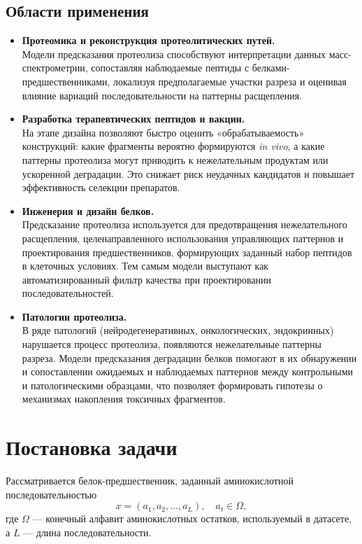 \documentclass{article}
\begin{document}
\subsection{Области применения}
\begin{itemize}
  \item \textbf{Протеомика и реконструкция протеолитических путей.}\\
  Модели предсказания протеолиза способствуют интерпретации данных масс-спектрометрии, сопоставляя наблюдаемые пептиды с белками-предшественниками, локализуя предполагаемые участки разреза и оценивая влияние вариаций последовательности на паттерны расщепления. 

  \item \textbf{Разработка терапевтических пептидов и вакцин.}\\
  На этапе дизайна позволяют быстро оценить «обрабатываемость» конструкций: какие фрагменты вероятно формируются \textit{in vivo}, а какие паттерны протеолиза могут приводить к нежелательным продуктам или ускоренной деградации. Это снижает риск неудачных кандидатов и повышает эффективность селекции препаратов.

  \item \textbf{Инженерия и дизайн белков.}\\
  Предсказание протеолиза используется для предотвращения нежелательного расщепления, целенаправленного использования управляющих паттернов и проектирования предшественников, формирующих заданный набор пептидов в клеточных условиях. Тем самым модели выступают как автоматизированный фильтр качества при проектировании последовательностей.

  \item \textbf{Патологии протеолиза.}\\
  В ряде патологий (нейродегенеративных, онкологических, эндокринных) нарушается процесс протеолиза, появляются нежелательные паттерны разреза. Модели предсказания деградации белков помогают в их обнаружении и сопоставлении ожидаемых и наблюдаемых паттернов между контрольными и патологическими образцами, что позволяет формировать гипотезы о механизмах накопления токсичных фрагментов.
\end{itemize}

\section{Постановка задачи}

Рассматривается белок-предшественник, заданный аминокислотной последовательностью
$$
x = (a_1, a_2, \dots, a_L), \quad a_t \in \Omega,
$$
где $\Omega$ --- конечный алфавит аминокислотных остатков, используемый в датасете, а $L$ --- длина последовательности.
\end{document}
